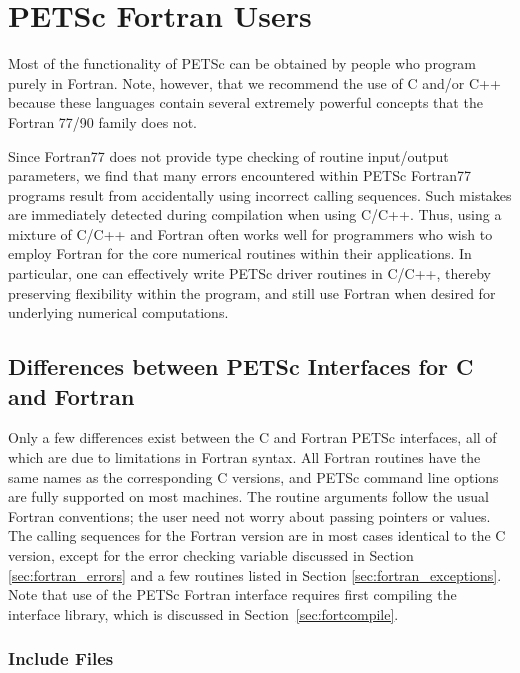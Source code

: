 \chapter{PETSc Fortran Users}
\label{ch:fortran}

Most of the functionality of PETSc can be obtained by people who
program purely in Fortran.  Note, however, that we recommend the
use of C and/or C++ because these languages contain several extremely powerful
concepts that the Fortran 77/90 family does not. 

Since Fortran77 does not provide type checking of routine input/output
parameters, we find that many errors encountered within PETSc Fortran77
programs result from accidentally using incorrect calling sequences.
Such mistakes are immediately detected during compilation when using
C/C++.  Thus, using a mixture of C/C++ and Fortran often works well
for programmers who wish to employ Fortran for the core numerical
routines within their applications.  In particular, one can
effectively write PETSc driver routines in C/C++, thereby preserving
flexibility within the program, and still use Fortran when desired for
underlying numerical computations.

\section{Differences between PETSc Interfaces for C and Fortran}

Only a few differences exist between the C and Fortran PETSc
interfaces, all of which are due to limitations in Fortran syntax.
All Fortran routines have the same names as the corresponding C
versions, and PETSc command line options are fully supported on most 
machines.  The
routine arguments follow the usual Fortran conventions; the user need
not worry about passing pointers or values.  The calling sequences
for the Fortran version are in most cases identical to the C version,
except for the error checking variable discussed in 
Section \ref{sec:fortran_errors} and a few routines listed in 
Section \ref{sec:fortran_exceptions}.
Note that use of the PETSc Fortran interface requires first compiling
the interface library, which is discussed in Section~\ref{sec:fortcompile}.

\subsection{Include Files}
\label{sec:fortran_includes}


